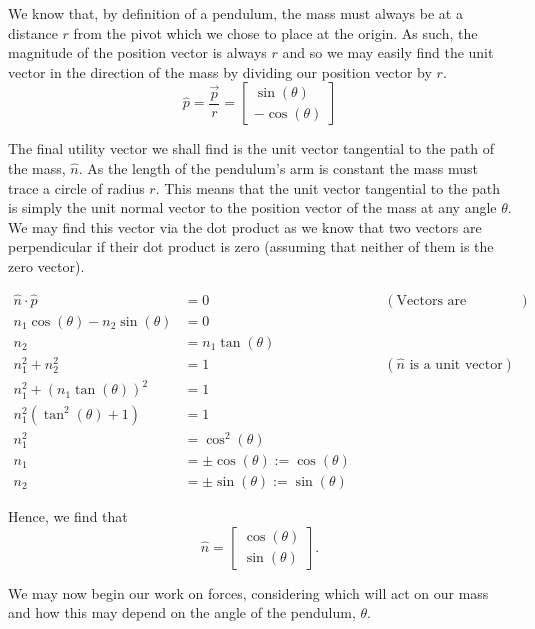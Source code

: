 \documentclass{article}
\begin{document}
We know that, by definition of a pendulum, the mass must always be at a distance $r$ from the pivot which we chose to place at the origin. As such, the magnitude of the position vector is always $r$ and so we may easily find the unit vector in the direction of the mass by dividing our position vector by $r$.
\begin{equation} \label{eq:unitPosVector}
	\hat{p} =\frac{\vec{p}}{r} =
	\begin{bmatrix}
		\sin(\theta) \\
		-\cos(\theta)
	\end{bmatrix}
\end{equation}

The final utility vector we shall find is the unit vector tangential to the path of the mass, $\hat{n}$. As the length of the pendulum's arm is constant the mass must trace a circle of radius $r$. This means that the unit vector tangential to the path is simply the unit normal vector to the position vector of the mass at any angle $\theta$. We may find this vector via the dot product as we know that two vectors are perpendicular if their dot product is zero (assuming that neither of them is the zero vector).

\begin{align*}
	\hat{n} \cdot \hat{p} &= 0 &&& (\text{Vectors are perpendicular}) \\
	n_1\cos(\theta) - n_2\sin(\theta) &= 0 \\
	n_2 &= n_1\tan(\theta) \\
	n_1^2 + n_2^2 &= 1 &&& (\hat{n}\text{ is a unit vector}) \\
	n_1^2 + (n_1\tan(\theta))^2 &= 1 \\
	n_1^2(\tan^2(\theta) + 1) &= 1 \\
	n_1^2 &= \cos^2(\theta) \\
	n_1 &= \pm \cos(\theta) := \cos(\theta) \\
	n_2 &= \pm \sin(\theta) := \sin(\theta)
\end{align*}

Hence, we find that
\begin{equation} \label{eq:unitNormVector}
	\hat{n} =
	\begin{bmatrix}
		\cos(\theta) \\
		\sin(\theta)
	\end{bmatrix}
	.
\end{equation}

We may now begin our work on forces, considering which will act on our mass and how this may depend on the angle of the pendulum, $\theta$.
\end{document}

